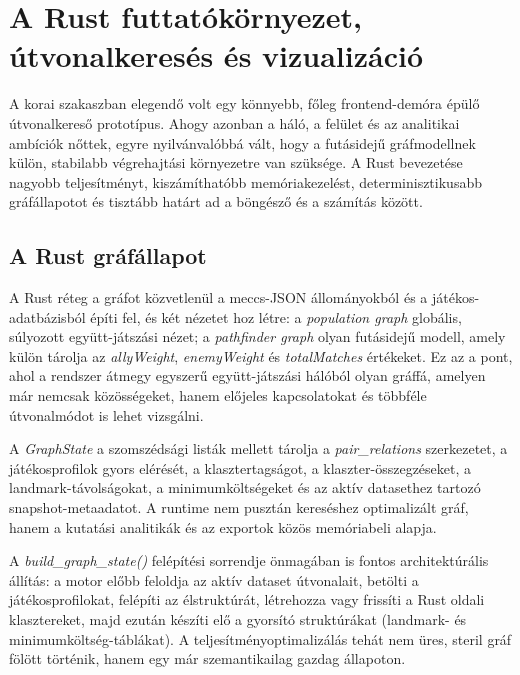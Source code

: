 \chapter{A Rust futtatókörnyezet, útvonalkeresés és vizualizáció}

A korai szakaszban elegendő volt egy könnyebb, főleg frontend-demóra épülő útvonalkereső prototípus. Ahogy azonban a háló, a felület és az analitikai ambíciók nőttek, egyre nyilvánvalóbbá vált, hogy a futásidejű gráfmodellnek külön, stabilabb végrehajtási környezetre van szüksége. A Rust bevezetése nagyobb teljesítményt, kiszámíthatóbb memóriakezelést, determinisztikusabb gráfállapotot és tisztább határt ad a böngésző és a számítás között.

\section{A Rust gráfállapot}

A Rust réteg a gráfot közvetlenül a meccs-JSON állományokból és a játékos-adatbázisból építi fel, és két nézetet hoz létre: a \textit{population graph} globális, súlyozott együtt-játszási nézet; a \textit{pathfinder graph} olyan futásidejű modell, amely külön tárolja az \textit{allyWeight}, \textit{enemyWeight} és \textit{totalMatches} értékeket. Ez az a pont, ahol a rendszer átmegy egyszerű együtt-játszási hálóból olyan gráffá, amelyen már nemcsak közösségeket, hanem előjeles kapcsolatokat és többféle útvonalmódot is lehet vizsgálni.

A \textit{GraphState} a szomszédsági listák mellett tárolja a \textit{pair\_relations} szerkezetet, a játékosprofilok gyors elérését, a klasztertagságot, a klaszter-összegzéseket, a landmark-távolságokat, a minimumköltségeket és az aktív datasethez tartozó snapshot-metaadatot. A runtime nem pusztán kereséshez optimalizált gráf, hanem a kutatási analitikák és az exportok közös memóriabeli alapja.

A \textit{build\_graph\_state()} felépítési sorrendje önmagában is fontos architektúrális állítás: a motor előbb feloldja az aktív dataset útvonalait, betölti a játékosprofilokat, felépíti az élstruktúrát, létrehozza vagy frissíti a Rust oldali klasztereket, majd ezután készíti elő a gyorsító struktúrákat (landmark- és minimumköltség-táblákat). A teljesítményoptimalizálás tehát nem üres, steril gráf fölött történik, hanem egy már szemantikailag gazdag állapoton.


